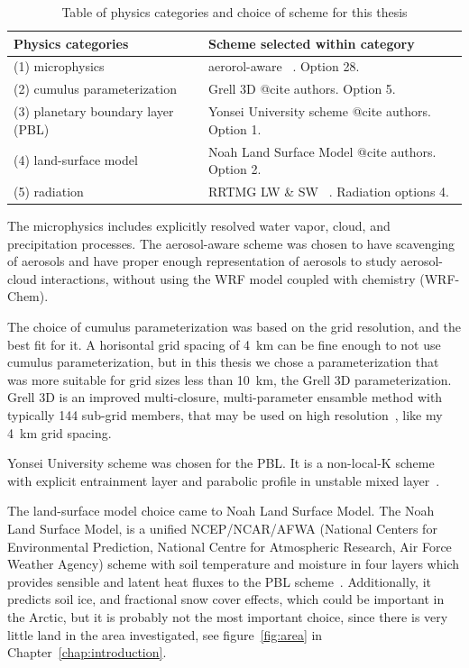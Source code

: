 \begin{table}[H]
\centering
\caption{Table of physics categories and choice of scheme for this thesis}
\label{tab:physics} 
\begin{tabular}{L{5.5cm} L{5.5cm}}
\centering
\textbf{Physics categories} & \textbf{Scheme selected within category}\\ \hline
(1) microphysics & aerorol-aware ~\citep{Reisner1998, Thompson2004, Thompson2008, Thompson2014}. Option 28.\\
(2) cumulus parameterization & Grell 3D  @cite authors. Option 5.\\
(3) planetary boundary layer (PBL) &  Yonsei University scheme @cite authors. Option 1.\\
(4) land-surface model & Noah Land Surface Model @cite authors. Option 2.\\
(5) radiation & RRTMG LW \& SW ~\citep{Mlawer1997, Iacono2000, Iacono2003, Iacono2008}. Radiation options 4.
\end{tabular}
\end{table}

The microphysics includes explicitly resolved water vapor, cloud, and precipitation processes. The aerosol-aware scheme was chosen to have scavenging of aerosols and have proper enough representation of aerosols to study aerosol-cloud interactions, without using the WRF model coupled with chemistry (WRF-Chem).

The choice of cumulus parameterization was based on the grid resolution, and the best fit for it. A horisontal grid spacing of 4~km can be fine enough to not use cumulus parameterization, but in this thesis we chose a parameterization that was more suitable for grid sizes less than 10~km, the Grell 3D parameterization. Grell 3D is an improved multi-closure, multi-parameter ensamble method with typically 144 sub-grid members, that may be used on high resolution~\citep{Wang2015}, like my 4~km grid spacing.

Yonsei University scheme was chosen for the PBL. It is a non-local-K scheme with explicit entrainment layer and parabolic profile in unstable mixed layer~\citep{Wang2015}.

The land-surface model choice came to Noah Land Surface Model. The Noah Land Surface Model, is a unified NCEP/NCAR/AFWA (National Centers for Environmental Prediction, National Centre for Atmospheric Research, Air Force Weather Agency) scheme with soil temperature and moisture in four layers which provides sensible and latent heat fluxes to the PBL scheme~\citep{Wang2015}. Additionally, it predicts soil ice, and fractional snow cover effects, which could be important in the Arctic, but it is probably not the most important choice, since there is very little land in the area investigated, see figure~\ref{fig:area} in Chapter~\ref{chap:introduction}.

